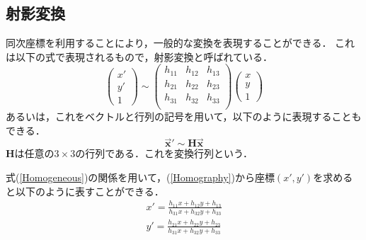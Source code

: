 \documentclass[openright]{nitocs}
\numberwithin{equation}{section}
\begin{document}
        \subsection{射影変換}
            同次座標を利用することにより，一般的な変換を表現することができる．
            これは以下の式で表現されるもので，射影変換と呼ばれている\cite{DIP}．
            \begin{equation} %
                \left(
                    \begin{array}{ccc}
                    x'\\
                    y'\\
                    1
                    \end{array}
                \right)\sim
                \left(
                    \begin{array}{ccc}
                    h_{11} & h_{12} & h_{13}\\
                    h_{21} & h_{22} & h_{23}\\
                    h_{31} & h_{32} & h_{33}\\
                    \end{array}
                \right)
                \left(
                    \begin{array}{ccc}
                    x\\
                    y\\
                    1
                    \end{array}
                \right)
                \label{Homography}
            \end{equation}
            あるいは，これをベクトルと行列の記号を用いて，以下のように表現することもできる．
            \begin{equation} %
                \bm{\vec{x}'} \sim \bm{H\vec{x}}
            \end{equation}
            $\bm{H}$は任意の$3\times3$の行列である．これを変換行列という．

            式(\ref{Homogeneous})の関係を用いて，(\ref{Homography})から座標$(x',y')$を求めると以下のように表すことができる．
            \begin{equation} %
                \begin{split} %
                    x' = \frac{h_{11}x+h_{12}y+h_{13}}{h_{31}x+h_{32}y+h_{33}} \\ 
                    y' = \frac{h_{21}x+h_{22}y+h_{23}}{h_{31}x+h_{32}y+h_{33}} \\ 
                \end{split}
                \label{transform_XY}
            \end{equation}
\end{document}
